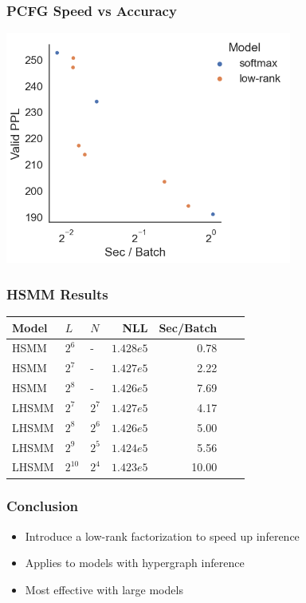 \documentclass{beamer}
\begin{document}
\begin{frame}
\frametitle{PCFG Speed vs Accuracy}
\centering
\includegraphics[height=3in]{imgs/hmm/pcfg-speed-accuracy.png}
\end{frame}

\begin{frame}
\frametitle{HSMM Results}
\begin{center}
\begin{tabular} {lllrrrr}
\toprule
Model & $L$ & $N$ & NLL & Sec/Batch \\
\midrule
HSMM & $2^6$ & - & $1.428e5$ & 0.78 \\
HSMM & $2^7$ & - & $1.427e5$  & 2.22\\
HSMM & $2^8$ & - & $1.426e5$ & 7.69 \\
\midrule
LHSMM & $2^7$ & $2^7$ & $1.427e5$ & 4.17 \\
LHSMM & $2^8$ & $2^6$ & $1.426e5$ & 5.00 \\
LHSMM & $2^9$ & $2^5$ & $1.424e5$ & 5.56 \\
LHSMM & $2^{10}$ & $2^4$ & $1.423e5$ & 10.00 \\
\bottomrule
\end{tabular}
\end{center}
\end{frame}



\begin{frame}
\frametitle{Conclusion}
\begin{itemize}
\item Introduce a low-rank factorization to speed up inference
\vspace{2em}
\item Applies to models with hypergraph inference
\vspace{2em}
\item Most effective with large models
\end{itemize}
\end{frame}
\end{document}
